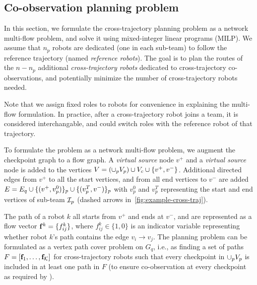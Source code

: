 \documentclass[10pt,twocolumn,twoside]{IEEEtran}
\newcommand{\news}{\color{blue}}
\begin{document}

\subsection{Co-observation planning problem}
In this section, we formulate the cross-trajectory planning problem as a network multi-flow problem, and solve it using mixed-integer linear programs (MILP). We assume that $n_p$ robots are dedicated (one in each sub-team) to follow the reference trajectory (named \emph{reference robots}). The goal is to plan the routes of the $n-n_p$ additional \emph{cross-trajectory robots} dedicated to cross-trajectory co-observations, and potentially minimize the number of cross-trajectory robots needed. 

\begin{remark}
Note that we assign fixed roles to robots for convenience in explaining the multi-flow formulation. In practice, after a cross-trajectory robot joins a team, it is considered interchangable, and could switch roles with the reference robot of that trajectory. %
\end{remark}

{\news To formulate the problem as a network multi-flow problem, we augment the checkpoint graph to a flow graph. A \emph{virtual source} node $v^{+}$ and a \emph{virtual source} node is added to the vertices $V= (\cup_p V_p) \cup V_c \cup \{v^{+},v^{-}\}$. Additional directed edges from $v^{+}$ to all the start vertices, and from all end vertices to $v^{-}$ are added $E = E_{q} \cup \{(v^{+},v^{0}_{p})\}_{p} \cup \{( v^{T}_{p},v^{-})\}_{p}$ with $v^0_p$ and $v^T_p$ representing the start and end vertices of sub-team $\mathcal{I}_p$ (dashed arrows in~\cref{fig:example-cross-traj}).}

The path of a robot $k$ all starts from $v^{+}$ and ends at $v^{-}$, and are represented as a flow vector $\mathbf{f}^{k} = \{ f^{k}_{ij} \}$, where $f^{k}_{ij} \in \{1,0\}$ is an indicator variable representing whether robot $k$'s path contains the edge $v_{i}\to v_{j}$. 
The planning problem can be formulated as a vertex path cover problem on $G_{q}$, i.e., as finding a set of paths $F=[\mathbf{f}_{1},\dots, \mathbf{f}_{\mathcal{K}}]$ for cross-trajectory robots such that every checkpoint in $\cup_p V_{p}$ is included in at least one path in $F$ (to ensure co-observation at every checkpoint as required by ). %
\end{document}
